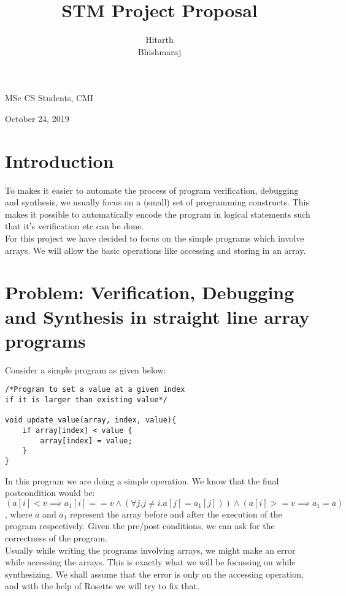 \documentclass[a4paper, 12pt, notitlepage] {article}
\author{Hitarth \\ Bhishmaraj}
\title{STM Project Proposal}
\date{} %
\begin{document}
\maketitle		


\begin{center}
MSc CS Students, CMI
\end{center}
\begin{center}
October 24, 2019
\end{center}
\newpage

\section{Introduction}
To makes it easier to automate the process of program verification, debugging and synthesis, we usually focus on a (small) set of programming constructs. This makes it possible to automatically encode the program in logical statements such that it's verification etc can be done. \\

For this project we have decided to focus on the simple programs which involve arrays. We will allow the basic operations like accessing and storing in an array.

\section {Problem: Verification, Debugging and Synthesis in straight line array programs}
Consider a simple program as given below:

\begin{verbatim}
/*Program to set a value at a given index 
if it is larger than existing value*/

void update_value(array, index, value){
    if array[index] < value {
        array[index] = value;
    }
}
\end{verbatim}

In this program we are doing a simple operation. We know that the final postcondition would be:  $( a[i] < v \implies a_1[i] == v \land (\forall{j} . j\neq i . a[j] = a_1[j]))    \land (a[i] >= v \implies a_1 = a)$, where $a$ and $a_1$ represent the array before and after the execution of the program respectively.
Given the pre/post conditions, we can ask for the correctness of the program.\\

Usually while writing the programs involving arrays, we might make an error while accessing the arrays. This is exactly what we will be focussing on while synthesizing. We shall assume that the error is only on the accessing operation, and with the help of Rosette we will try to fix that.\\
\end{document}
